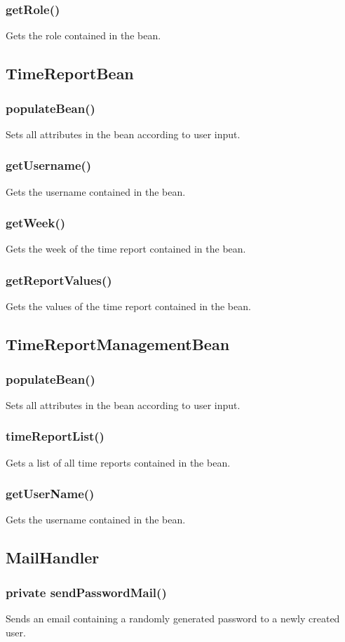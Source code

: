 \documentclass{article}
\begin{document}
\subsubsection{getRole()}
Gets the role contained in the bean.
\subsection{TimeReportBean}
\subsubsection{populateBean()}
Sets all attributes in the bean according to user input.
\subsubsection{getUsername()}
Gets the username contained in the bean.
\subsubsection{getWeek()}
Gets the week of the time report contained in the bean.
\subsubsection{getReportValues()}
Gets the values of the time report contained in the bean.

\subsection{TimeReportManagementBean}
\subsubsection{populateBean()}
Sets all attributes in the bean according to user input.
\subsubsection{timeReportList()}
Gets a list of all time reports contained in the bean.
\subsubsection{getUserName()}
Gets the username contained in the bean.

\subsection{MailHandler}
\subsubsection{private sendPasswordMail()}
Sends an email containing a randomly generated password to a newly created user.
\end{document}
